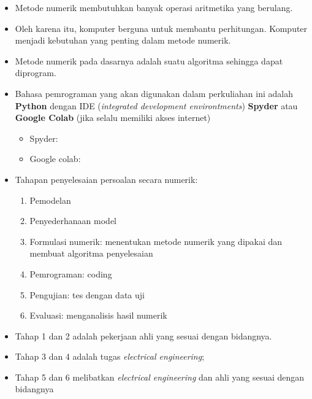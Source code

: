 \documentclass[pdflatex,compress]{beamer}
\begin{document}
\begin{frame}
	\begin{itemize}
		\item Metode numerik membutuhkan banyak operasi aritmetika yang berulang.
		\item Oleh karena itu, komputer berguna untuk membantu perhitungan. Komputer menjadi kebutuhan yang penting dalam metode numerik.
		\item Metode numerik pada dasarnya adalah suatu algoritma sehingga dapat diprogram.
		\item Bahasa pemrograman yang akan digunakan dalam perkuliahan ini adalah \textbf{Python} dengan IDE (\textit{integrated development environtments}) \textbf{Spyder} atau \textbf{Google Colab} (jika selalu memiliki akses internet)
		\begin{itemize}
			\item Spyder: \href{https://github.com/spyder-ide/spyder/releases/latest/download/Spyder_64bit_full.exe}{}
			\item Google colab: \href{https://colab.research.google.com/}{}
		\end{itemize}
	\end{itemize}
\end{frame}

\begin{frame}
	\begin{itemize}
		\item Tahapan penyelesaian persoalan secara numerik:
		\begin{enumerate}
			\item Pemodelan
			\item Penyederhanaan model
			\item Formulasi numerik: menentukan metode numerik yang dipakai dan membuat algoritma penyelesaian
			\item Pemrograman: coding
			\item Pengujian: tes dengan data uji
			\item Evaluasi: menganalisis hasil numerik
		\end{enumerate}
		\item Tahap 1 dan 2 adalah pekerjaan ahli yang sesuai dengan bidangnya.
		\item Tahap 3 dan 4 adalah tugas \textit{electrical engineering};
		\item Tahap 5 dan 6 melibatkan \textit{electrical engineering} dan ahli yang sesuai dengan bidangnya
		
	\end{itemize}
\end{frame}
\end{document}
